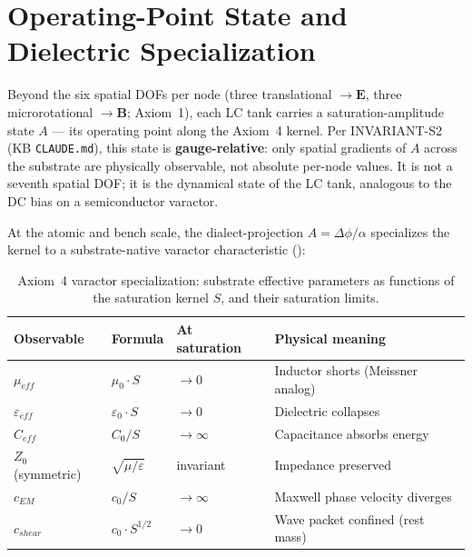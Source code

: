 \section{Operating-Point State and Dielectric Specialization}
\label{sec:vol9_dielectric_specialization}

Beyond the six spatial DOFs per node (three translational $\to \mathbf{E}$, three microrotational $\to \mathbf{B}$; Axiom~1), each LC tank carries a saturation-amplitude state $A$ --- its operating point along the Axiom~4 kernel. Per INVARIANT-S2 (KB \texttt{CLAUDE.md}), this state is \textbf{gauge-relative}: only spatial gradients of $A$ across the substrate are physically observable, not absolute per-node values. It is not a seventh spatial DOF; it is the dynamical state of the LC tank, analogous to the DC bias on a semiconductor varactor.

At the atomic and bench scale, the dialect-projection $A = \Delta\phi/\alpha$ specializes the kernel to a substrate-native varactor characteristic ():

\begin{table}[htbp]
\centering\small
\begin{tabular}{llll}
\toprule
\textbf{Observable} & \textbf{Formula} & \textbf{At saturation} & \textbf{Physical meaning} \\
\midrule
$\mu_{eff}$       & $\mu_0 \cdot S$              & $\to 0$       & Inductor shorts (Meissner analog) \\
$\varepsilon_{eff}$ & $\varepsilon_0 \cdot S$    & $\to 0$       & Dielectric collapses \\
$C_{eff}$         & $C_0 / S$                    & $\to \infty$  & Capacitance absorbs energy \\
$Z_0$ (symmetric) & $\sqrt{\mu/\varepsilon}$     & invariant     & Impedance preserved \\
$c_{EM}$          & $c_0 / S$                    & $\to \infty$  & Maxwell phase velocity diverges \\
$c_{shear}$       & $c_0 \cdot S^{1/2}$          & $\to 0$       & Wave packet confined (rest mass) \\
\bottomrule
\end{tabular}
\caption{Axiom~4 varactor specialization: substrate effective parameters as functions of the saturation kernel $S$, and their saturation limits.}
\label{tab:vol9_saturation_varactor}
\end{table}

